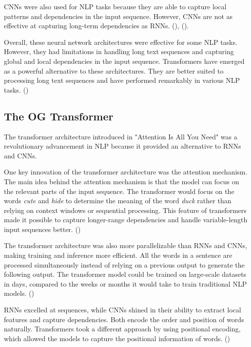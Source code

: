 CNNs were also used for NLP tasks because they are able to capture local patterns and dependencies in the input sequence. However, CNNs are not as effective at capturing long-term dependencies as RNNs. (\cite{camacho-collados_embeddings_2022}), (\cite{geron_hands-machine_2019}).

Overall, these neural network architectures were effective for some NLP tasks. However, they had limitations in handling long text sequences and capturing global and local dependencies in the input sequence. Transformers have emerged as a powerful alternative to these architectures. They are better suited to processing long text sequences and have performed remarkably in various NLP tasks. (\cite{geron_hands-machine_2019})

\subsection{The OG Transformer} \label{the-og-transformer}

The transformer architecture introduced in "Attention Is All You Need" was a revolutionary advancement in NLP because it provided an alternative to RNNs and CNNs. \cite{vaswani_attention_2017}

One key innovation of the transformer architecture was the attention mechanism. The main idea behind the attention mechanism is that the model can focus on the relevant parts of the input sequence. The transformer would focus on the words \textit{cute} and \textit{hide} to determine the meaning of the word \textit{duck} rather than relying on context windows or sequential processing. This feature of transformers made it possible to capture longer-range dependencies and handle variable-length input sequences better. (\cite{vaswani_attention_2017})

The transformer architecture was also more parallelizable than RNNs and CNNs, making training and inference more efficient. All the words in a sentence are processed simultaneously instead of relying on a previous output to generate the following output. The transformer model could be trained on large-scale datasets in days, compared to the weeks or months it would take to train traditional NLP models. (\cite{vaswani_attention_2017})

RNNs excelled at sequences, while CNNs shined in their ability to extract local features and capture dependencies. Both encode the order and position of words naturally. Transformers took a different approach by using positional encoding, which allowed the models to capture the positional information of words. (\cite{vaswani_attention_2017})


